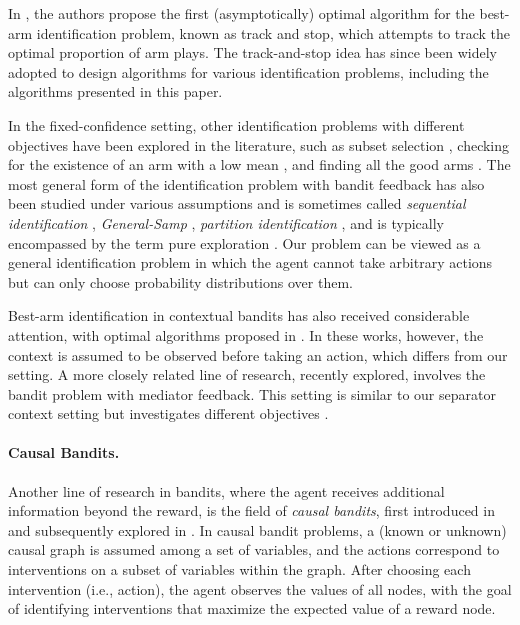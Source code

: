In \cite{track-stop-garivier2016optimal}, the authors propose the first (asymptotically) optimal algorithm for the best-arm identification problem, known as track and stop, which attempts to track the optimal proportion of arm plays. The track-and-stop idea has since been widely adopted to design algorithms for various identification problems, including the algorithms presented in this paper.

In the fixed-confidence setting, other identification problems with different objectives have been explored in the literature, such as subset selection \cite{subset-selection1-kalyanakrishnan2012pac, subset-selection2-kaufmann2013information}, checking for the existence of an arm with a low mean \cite{badarm1-tabata2020bad, badarm2-kaufmann2018sequential}, and finding all the good arms \cite{all-good-arms-mason2020finding}. The most general form of the identification problem with bandit feedback has also been studied under various assumptions and is sometimes called \textit{sequential identification} \cite{kaufmann2021mixture}, \textit{General-Samp} \cite{general-samp-chen2017nearly}, \textit{partition identification} \cite{partition-id-juneja2019sample}, and is typically encompassed by the term pure exploration \cite{frank-wolf-wang2021fast, mutiple-correct-answers-degenne2019pure}. 
Our problem can be viewed as a general identification problem in which the agent cannot take arbitrary actions but can only choose probability distributions over them.


Best-arm identification in contextual bandits has also received considerable attention, with optimal algorithms proposed in \cite{context1-li2022instance, context2-kato2021role}. In these works, however, the context is assumed to be observed before taking an action, which differs from our setting. A more closely related line of research, recently explored, involves the bandit problem with mediator feedback. This setting is similar to our separator context setting but investigates different objectives \cite{mediator-poiani2023pure, mediator2-reddy2023best, mediator-cum-eldowa2024information}.







\paragraph{Causal Bandits.}
Another line of research in bandits, where the agent receives additional information beyond the reward, is the field of \textit{causal bandits}, first introduced in \cite{lattimore2016causal} and subsequently explored in \cite{causal-context-madhavan2024causal, causal-fateme-jamshidi2024confounded, causal-fairness-huang2022achieving, causal-pure-xiong2022combinatorial}. In causal bandit problems, a (known or unknown) causal graph is assumed among a set of variables, and the actions correspond to interventions on a subset of variables within the graph. After choosing each intervention (i.e., action), the agent observes the values of all nodes, with the goal of identifying interventions that maximize the expected value of a reward node.


